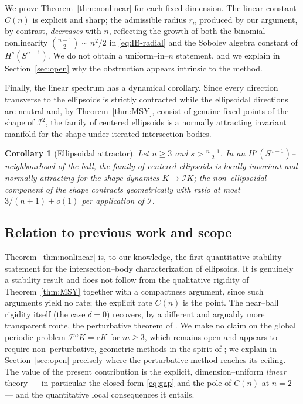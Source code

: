 \documentclass[10pt,a4paper]{amsart}
\newtheorem{corollary}[theorem]{Corollary}
\newcommand{\Sph}{S^{n-1}}
\newcommand{\IB}{\mathcal{I}}
\begin{document}
We prove Theorem~\ref{thm:nonlinear} for each fixed dimension. The linear
constant $C(n)$ is explicit and sharp; the admissible radius $r_n$ produced by
our argument, by contrast, \emph{decreases} with $n$, reflecting the growth of
both the binomial nonlinearity $\binom{n-1}{2}\sim n^2/2$ in
\eqref{eq:IB-radial} and the Sobolev algebra constant of $H^s(\Sph)$. We do not
obtain a uniform--in--$n$ statement, and we explain in Section~\ref{sec:open}
why the obstruction appears intrinsic to the method.

Finally, the linear spectrum has a dynamical corollary. Since every direction
transverse to the ellipsoids is strictly contracted while the ellipsoidal
directions are neutral and, by Theorem~\ref{thm:MSY}, consist of genuine
fixed points of the shape of $\IB^2$, the family of centered ellipsoids is a
normally attracting invariant manifold for the shape under iterated
intersection bodies.

\begin{corollary}[Ellipsoidal attractor]\label{cor:attractor}
Let $n\ge 3$ and $s>\tfrac{n-1}{2}$. In an $H^s(\Sph)$--neighbourhood of the
ball, the family of centered ellipsoids is locally invariant and normally
attracting for the shape dynamics $K\mapsto \IB K$; the non--ellipsoidal
component of the shape contracts geometrically with ratio at most
$3/(n+1)+o(1)$ per application of $\IB$.
\end{corollary}

\subsection{Relation to previous work and scope}
Theorem~\ref{thm:nonlinear} is, to our knowledge, the first quantitative
stability statement for the intersection--body characterization of ellipsoids.
It is genuinely a stability result and does not follow from the qualitative
rigidity of Theorem~\ref{thm:MSY} together with a compactness argument, since
such arguments yield no rate; the explicit rate $C(n)$ is the point. The
near--ball rigidity itself (the case $\delta=0$) recovers, by a different and
arguably more transparent route, the perturbative theorem of
\cite{FNRZ2011}. We make no claim on the global periodic problem
$\IB^m K = cK$ for $m\ge 3$, which remains open and appears to require
non--perturbative, geometric methods in the spirit of \cite{MSY2025}; we
explain in Section~\ref{sec:open} precisely where the perturbative method
reaches its ceiling. The value of the present contribution is the explicit,
dimension--uniform \emph{linear} theory --- in particular the closed form
\eqref{eq:gap} and the pole of $C(n)$ at $n=2$ --- and the quantitative local
consequences it entails.
\end{document}
